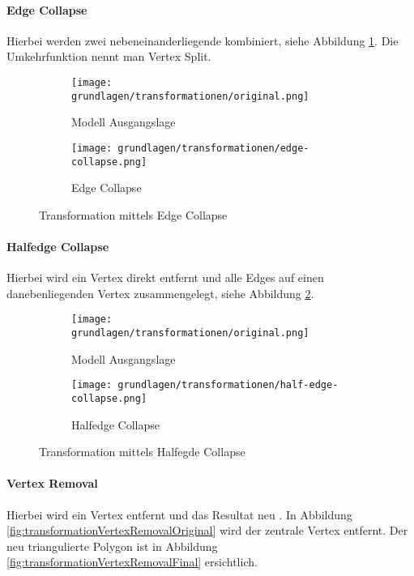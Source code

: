 \paragraph{Edge Collapse}
Hierbei werden zwei nebeneinanderliegende  kombiniert, siehe Abbildung \ref{fig:transformationEdgeCollapse}.
Die Umkehrfunktion nennt man Vertex Split.

\begin{figure}[H]
  \centering
  \begin{subfigure}{.5\textwidth}
    \centering
    \texttt{[image: grundlagen/transformationen/original.png]}
    \caption{Modell Ausgangslage}
  \end{subfigure}%
  \begin{subfigure}{.5\textwidth}
    \centering
    \texttt{[image: grundlagen/transformationen/edge-collapse.png]}
    \caption{Edge Collapse}
  \end{subfigure}
  \caption{Transformation mittels Edge Collapse}
  \label{fig:transformationEdgeCollapse}
\end{figure}

\paragraph{Halfedge Collapse}
Hierbei wird ein Vertex direkt entfernt und alle Edges auf einen danebenliegenden Vertex zusammengelegt, siehe Abbildung \ref{fig:transformationHalfedgeCollapse}.

\begin{figure}[H]
  \centering
  \begin{subfigure}{.5\textwidth}
    \centering
    \texttt{[image: grundlagen/transformationen/original.png]}
    \caption{Modell Ausgangslage}
  \end{subfigure}%
  \begin{subfigure}{.5\textwidth}
    \centering
    \texttt{[image: grundlagen/transformationen/half-edge-collapse.png]}
    \caption{Halfedge Collapse}
  \end{subfigure}
  \caption{Transformation mittels Halfegde Collapse}
  \label{fig:transformationHalfedgeCollapse}
\end{figure}

\paragraph{Vertex Removal}
Hierbei wird ein Vertex entfernt und das Resultat neu .
In Abbildung \ref{fig:transformationVertexRemovalOriginal} wird der zentrale Vertex entfernt. Der neu triangulierte Polygon ist in Abbildung \ref{fig:transformationVertexRemovalFinal} ersichtlich.

